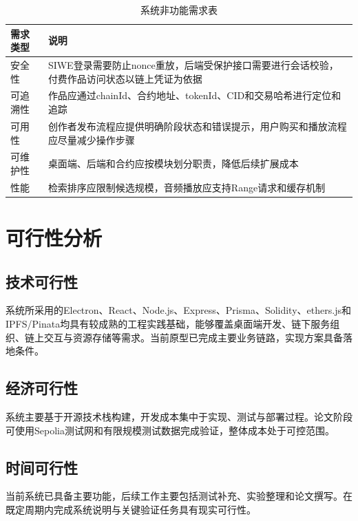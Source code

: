 \begin{table}[htbp]
    \linespread{1.5}
    \songti
    \centering
    \caption{系统非功能需求表}\label{tab:non_functional_requirements}
    \begin{tabular}{|l|p{10cm}|}
        \hline
        需求类型 & 说明                                                 \\ \hline
        安全性  & SIWE登录需要防止nonce重放，后端受保护接口需要进行会话校验，付费作品访问状态以链上凭证为依据 \\ \hline
        可追溯性 & 作品应通过chainId、合约地址、tokenId、CID和交易哈希进行定位和追踪          \\ \hline
        可用性  & 创作者发布流程应提供明确阶段状态和错误提示，用户购买和播放流程应尽量减少操作步骤           \\ \hline
        可维护性 & 桌面端、后端和合约应按模块划分职责，降低后续扩展成本                         \\ \hline
        性能   & 检索排序应限制候选规模，音频播放应支持Range请求和缓存机制                    \\ \hline
    \end{tabular}
\end{table}

\section{可行性分析}

\subsection{技术可行性}

系统所采用的Electron、React、Node.js、Express、Prisma、Solidity、ethers.js和IPFS/Pinata均具有较成熟的工程实践基础，能够覆盖桌面端开发、链下服务组织、链上交互与资源存储等需求。当前原型已完成主要业务链路，实现方案具备落地条件。

\subsection{经济可行性}

系统主要基于开源技术栈构建，开发成本集中于实现、测试与部署过程。论文阶段可使用Sepolia测试网和有限规模测试数据完成验证，整体成本处于可控范围。

\subsection{时间可行性}

当前系统已具备主要功能，后续工作主要包括测试补充、实验整理和论文撰写。在既定周期内完成系统说明与关键验证任务具有现实可行性。